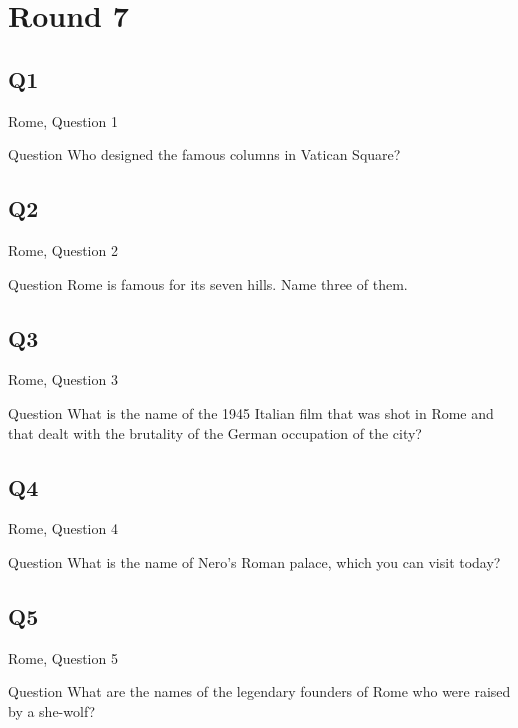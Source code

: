 \documentclass[11pt]{beamer}
\begin{document}
\section{Round 7}
\subsection*{Q1}
\begin{frame}[t]{Rome, Question 1}
\begin{block}{Question}
Who designed the famous columns in Vatican Square?
\end{block}
\end{frame}
\subsection*{Q2}
\begin{frame}[t]{Rome, Question 2}
\begin{block}{Question}
Rome is famous for its seven hills. Name three of them.
\end{block}
\end{frame}
\subsection*{Q3}
\begin{frame}[t]{Rome, Question 3}
\begin{block}{Question}
What is the name of the 1945 Italian film that was shot in Rome and that dealt with the brutality of the German occupation of the city?
\end{block}
\end{frame}
\subsection*{Q4}
\begin{frame}[t]{Rome, Question 4}
\begin{block}{Question}
What is the name of Nero's Roman palace, which you can visit today?
\end{block}
\end{frame}
\subsection*{Q5}
\begin{frame}[t]{Rome, Question 5}
\begin{block}{Question}
What are the names of the legendary founders of Rome who were raised by a she-wolf?
\end{block}
\end{frame}
\end{document}
